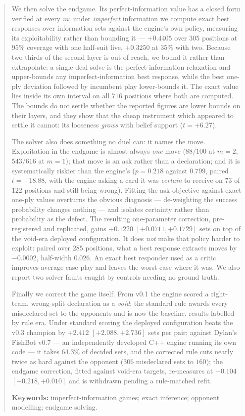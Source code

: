 \documentclass[11pt,a4paper]{article}
\begin{document}
\begin{abstract}
We then solve the endgame. Its perfect-information value has a closed form
verified at every $m$; under
\emph{imperfect} information we compute exact best responses over information
sets against the engine's own policy, measuring its exploitability rather than
bounding it --- $+0.4405$ over $305$ positions at $95\%$ coverage with one
half-suit live, $+0.3250$ at $35\%$ with two. Because two
thirds of the second layer is out of reach, we bound it rather than
extrapolate: a single-deal solve is the perfect-information relaxation and
upper-bounds any imperfect-information best response, while the best one-ply
deviation followed by incumbent play lower-bounds it. The exact value lies
inside its own interval on all $716$ positions where both are computed. The
bounds do not settle whether the reported figures are lower bounds on their
layers, and they show that the cheap instrument which appeared to settle it
cannot: its looseness \emph{grows} with belief support ($t = +6.27$).

The solver also does something no duel can: it names the move. Exploitation in
the endgame is almost always \emph{one} move ($88/100$ at $m = 2$, $543/616$ at
$m = 1$); that move is an ask rather than a declaration; and it is
systematically riskier than the engine's ($p = 0.218$ against $0.799$, paired
$t = -18.88$, with the engine asking a card it was \emph{certain} to receive on
$73$ of $122$ positions and still being wrong). Fitting the ask objective
against exact one-ply values overturns the obvious diagnosis --- de-weighting
the success probability changes nothing --- and isolates certainty rather than
probability as the defect. The resulting one-parameter correction, pre-registered and replicated, gains
$\mathbf{+0.1220}$ $[+0.0711, +0.1729]$ sets on top of the void-era deployed
configuration. It does \emph{not} make that policy harder to
exploit: paired over $285$ positions, what a best response extracts moves by
$-0.0002$, half-width $0.026$. An exact best responder used as a critic
improves average-case play and leaves the worst case where it was. We also report two solver faults caught by controls needing no ground truth.

Finally we correct the game itself. From v0.1 the engine scored a
right-team, wrong-split declaration as a \emph{void}; the standard rule
awards every misdeclared set to the opponents and is now the baseline,
results labelled by rule era. Under standard scoring the deployed
configuration beats the v0.3 champion by $\mathbf{+2.412}$
$[+2.088, +2.736]$ sets per pair; against Dylan's FishBot v0.7 --- an
independently developed C++ engine running its own code --- it takes
$64.3\%$ of decided sets, and the corrected rule cuts nearly twice as hard
against the opponent ($306$ misdeclared sets to $160$); the endgame
correction, fitted against void-era targets, re-measures at $-0.104$
$[-0.218, +0.010]$ and is withdrawn pending a rule-matched refit.

\vspace{1pt}
\noindent\textbf{Keywords:} imperfect-information games; exact inference; opponent modelling; endgame solving.
\end{abstract}
\end{document}
